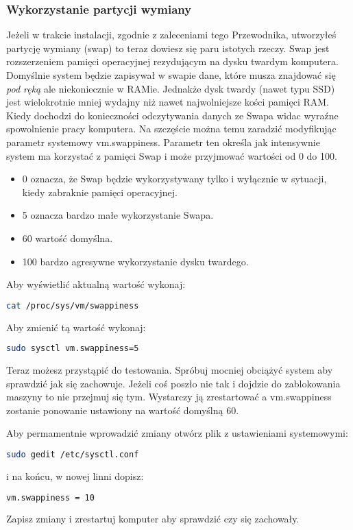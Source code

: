 \subsubsection{Wykorzystanie partycji wymiany}
Jeżeli w trakcie instalacji, zgodnie z zaleceniami tego Przewodnika, utworzyłeś partycję wymiany (swap) to teraz dowiesz się paru istotych rzeczy. Swap jest rozszerzeniem pamięci operacyjnej rezydującym na dysku twardym komputera. Domyślnie system będzie zapisywał w swapie dane, które musza znajdować się \emph{pod ręką} ale niekoniecznie w RAMie. Jednakże dysk twardy (nawet typu SSD) jest wielokrotnie mniej wydajny niż nawet najwolniejsze kości pamięci RAM. Kiedy dochodzi do konieczności odczytywania danych ze Swapa widac wyraźne spowolnienie pracy komputera. Na szczęście można temu zaradzić modyfikując parametr systemowy \textcolor{ubuntu_orange}{vm.swappiness}. Parametr ten określa jak intensywnie system ma korzystać z pamięci Swap i może przyjmować wartości od 0 do 100.
\begin{itemize}
\item \textcolor{ubuntu_orange}{0} oznacza, że Swap będzie wykorzystywany tylko i wyłącznie w sytuacji, kiedy zabraknie pamięci operacyjnej.
\item \textcolor{ubuntu_orange}{5} oznacza bardzo małe wykorzystanie Swapa.
\item \textcolor{ubuntu_orange}{60} wartość domyślna.
\item \textcolor{ubuntu_orange}{100} bardzo agresywne wykorzystanie dysku twardego.
\end{itemize}
Aby wyświetlić aktualną wartość wykonaj:
\begin{lstlisting}[language=bash]
cat /proc/sys/vm/swappiness
\end{lstlisting}
Aby zmienić tą wartość wykonaj:
\begin{lstlisting}[language=bash]
sudo sysctl vm.swappiness=5
\end{lstlisting}
Teraz możesz przystąpić do testowania. Spróbuj mocniej obciążyć system aby sprawdzić jak się zachowuje. Jeżeli coś poszło nie tak i dojdzie do zablokowania maszyny to nie przejmuj się tym. Wystarczy ją zrestartować a vm.swappiness zostanie ponowanie ustawiony na wartość domyślną 60.

Aby permamentnie wprowadzić zmiany otwórz plik z ustawieniami systemowymi:
\begin{lstlisting}[language=bash]
sudo gedit /etc/sysctl.conf
\end{lstlisting}
i na końcu, w nowej linni dopisz:
\begin{lstlisting}[language=bash]
vm.swappiness = 10
\end{lstlisting}
Zapisz zmiany i zrestartuj komputer aby sprawdzić czy się zachowały.